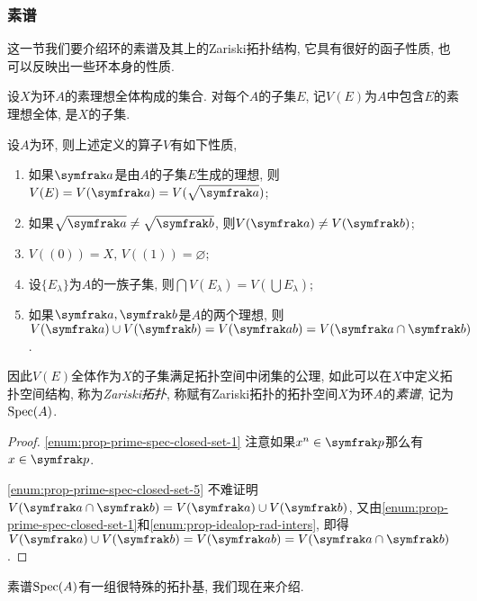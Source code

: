 \subsubsection{素谱}\label{sec:algebra-primespec}

这一节我们要介绍环的素谱及其上的Zariski拓扑结构, 它具有很好的函子性质, 也可以反映出一些环本身的性质.

设$X$为环$A$的素理想全体构成的集合. 对每个$A$的子集$E$, 记$V(E)$为$A$中包含$E$的素理想全体, 是$X$的子集.

\begin{proposition}\label{prop:primespecclosedset}
  设$A$为环, 则上述定义的算子$V$有如下性质,
  \begin{enumerate}
    \item\label{enum:prop-prime-spec-closed-set-1} 如果$\ideal{a}$是由$A$的子集$E$生成的理想, 则$V(E)=V(\ideal{a})=V(\sqrt{\ideal{a}})$;
    \item\label{enum:prop-prime-spec-closed-set-2} 如果$\sqrt{\ideal{a}}\neq\sqrt{\ideal{b}}$, 则$V(\ideal{a})\neq V(\ideal{b})$;
    \item\label{enum:prop-prime-spec-closed-set-3} $V((0))=X$, $V((1))=\varnothing$;
    \item\label{enum:prop-prime-spec-closed-set-4} 设$\{E_\lambda\}$为$A$的一族子集, 则$\bigcap V(E_\lambda)=V(\bigcup E_\lambda)$;
    \item\label{enum:prop-prime-spec-closed-set-5} 如果$\ideal{a}, \ideal{b}$是$A$的两个理想, 则$V(\ideal{a})\cup V(\ideal{b})=V(\ideal{ab})= V(\ideal{a}\cap \ideal{b})$.
  \end{enumerate}
  因此$V(E)$全体作为$X$的子集满足拓扑空间中闭集的公理, 如此可以在$X$中定义拓扑空间结构, 称为\emph{Zariski拓扑}, 称赋有Zariski拓扑的拓扑空间$X$为环$A$的\emph{素谱}, 记为$\operatorname{Spec} (A)$.
\end{proposition}

\begin{proof}
  \ref{enum:prop-prime-spec-closed-set-1} 注意如果$x^n\in \ideal{p}$那么有$x\in\ideal{p}$.

  \ref{enum:prop-prime-spec-closed-set-5} 不难证明$V(\ideal{a}\cap\ideal{b})=V(\ideal{a})\cup V(\ideal{b})$, 又由\ref{enum:prop-prime-spec-closed-set-1}和\ref{enum:prop-idealop-rad-inters}, 即得$V(\ideal{a})\cup V(\ideal{b})=V(\ideal{ab})= V(\ideal{a}\cap \ideal{b})$.
\end{proof}

素谱$\operatorname{Spec} (A)$有一组很特殊的拓扑基, 我们现在来介绍.

